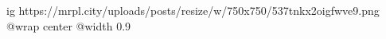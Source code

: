 
 
 
 
 

\ifcmt
  ig https://mrpl.city/uploads/posts/resize/w/750x750/537tnkx2oigfwve9.png
  @wrap center
  @width 0.9
\fi
